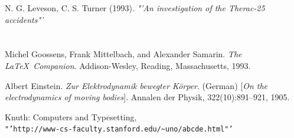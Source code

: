 \documentclass{article}%
\begin{document}
\begin{thebibliography}{9}
\bibitem{}
N. G. Leveson, C. S. Turner (1993).
\textit{"'An investigation of the Therac-25 accidents"'}\\
\\\\
Michel Goossens, Frank Mittelbach, and Alexander Samarin. 
\textit{The \LaTeX\ Companion}. 
Addison-Wesley, Reading, Massachusetts, 1993.

Albert Einstein. 
\textit{Zur Elektrodynamik bewegter K{\"o}rper}. (German) 
[\textit{On the electrodynamics of moving bodies}]. 
Annalen der Physik, 322(10):891–921, 1905.

Knuth: Computers and Typesetting, \\
\texttt{"'http://www-cs-faculty.stanford.edu/\~{}uno/abcde.html"'}

\end{thebibliography}
\end{document}
